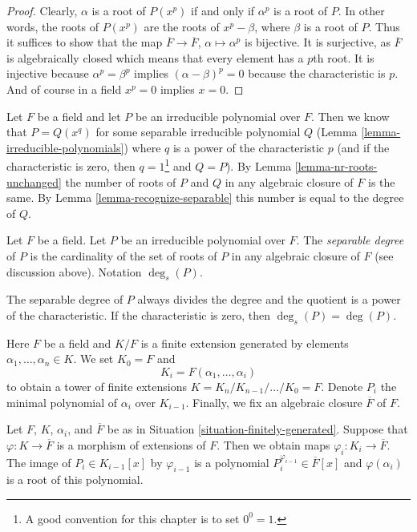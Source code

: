 \begin{proof}
Clearly, $\alpha$ is a root of $P(x^p)$ if and only if $\alpha^p$ is a
root of $P$. In other words, the roots of $P(x^p)$ are the roots of
$x^p - \beta$, where $\beta$ is a root of $P$. Thus it suffices to show
that the map $\overline{F} \to \overline{F}$, $\alpha \mapsto \alpha^p$
is bijective. It is surjective, as $\overline{F}$ is algebraically closed
which means that every element has a $p$th root. It is injective because
$\alpha^p = \beta^p$ implies $(\alpha - \beta)^p = 0$ because
the characteristic is $p$. And of course in a field $x^p = 0$ implies
$x = 0$.
\end{proof}

\noindent
Let $F$ be a field and let $P$ be an irreducible polynomial over $F$.
Then we know that $P = Q(x^q)$ for some separable irreducible polynomial $Q$
(Lemma \ref{lemma-irreducible-polynomials}) where $q$ is a power of
the characteristic $p$ (and if the characteristic is zero, then
$q = 1$\footnote{A good convention for this chapter is to set $0^0 = 1$.}
and $Q = P$). By Lemma \ref{lemma-nr-roots-unchanged} the number of
roots of $P$ and $Q$ in any algebraic closure of $F$ is the same.
By Lemma \ref{lemma-recognize-separable} this number is equal to the degree
of $Q$.

\begin{definition}
\label{definition-separable-degree}
Let $F$ be a field. Let $P$ be an irreducible polynomial over $F$.
The {\it separable degree} of $P$ is the cardinality of the
set of roots of $P$ in any algebraic closure of $F$ (see discussion
above). Notation $\deg_s(P)$.
\end{definition}

\noindent
The separable degree of $P$ always divides the degree and the quotient
is a power of the characteristic. If the characteristic is zero, then
$\deg_s(P) = \deg(P)$.

\begin{situation}
\label{situation-finitely-generated}
Here $F$ be a field and $K/F$ is a finite extension generated by elements
$\alpha_1, \ldots, \alpha_n \in K$. We set $K_0 = F$ and
$$
K_i = F(\alpha_1, \ldots, \alpha_i)
$$
to obtain a tower of finite extensions
$K = K_n / K_{n - 1} / \ldots / K_0 = F$.
Denote $P_i$ the minimal polynomial of $\alpha_i$ over $K_{i - 1}$.
Finally, we fix an algebraic closure $\overline{F}$ of $F$.
\end{situation}

\noindent
Let $F$, $K$, $\alpha_i$, and $\overline{F}$ be as in
Situation \ref{situation-finitely-generated}.
Suppose that $\varphi : K \to \overline{F}$ is a morphism of extensions
of $F$. Then we obtain maps $\varphi_i : K_i \to \overline{F}$.
The image of $P_i \in K_{i - 1}[x]$ by $\varphi_{i - 1}$
is a polynomial $P_i^{\varphi_{i - 1}} \in \overline{F}[x]$
and $\varphi(\alpha_i)$ is a root of this polynomial.

